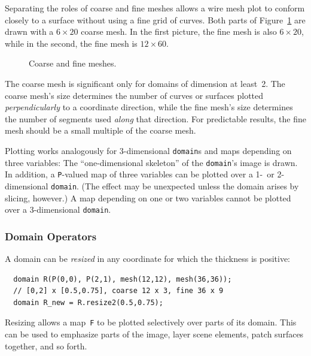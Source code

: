 \documentclass[12pt]{report}
\newcommand{\code}[1]{\texttt{#1}}
\begin{document}
Separating the roles of coarse and fine meshes allows a wire mesh plot
to conform closely to a surface without using a fine grid of curves.
Both parts of Figure~\ref{fig:plot} are drawn with a $6\times20$
coarse mesh. In the first picture, the fine mesh is also $6\times20$,
while in the second, the fine mesh is $12\times60$.

\begin{figure}[hbt]
  \begin{center}
    \hspace*{0.5in}
    
    \caption{Coarse and fine meshes.}
    \label{fig:plot}
  \end{center}
\end{figure}

The coarse mesh is significant only for domains of dimension at
least~2. The coarse mesh's size determines the number of curves or
surfaces plotted \emph{perpendicularly} to a coordinate direction,
while the fine mesh's size determines the number of segments used
\emph{along} that direction.  For predictable results, the fine mesh
should be a small multiple of the coarse mesh.

Plotting works analogously for 3-dimensional \code{domain}s and maps
depending on three variables: The ``one-dimensional skeleton'' of the
\code{domain}'s image is drawn.  In addition, a \code{P}-valued map of
three variables can be plotted over a 1-~or 2-dimensional
\code{domain}. (The effect may be unexpected unless the domain arises
by slicing, however.) A map depending on one or two variables cannot
be plotted over a 3-dimensional \code{domain}.


\subsubsection*{Domain Operators}

 A domain can be \emph{resized} in any
coordinate for which the thickness is positive:
\begin{verbatim}
  domain R(P(0,0), P(2,1), mesh(12,12), mesh(36,36));
  // [0,2] x [0.5,0.75], coarse 12 x 3, fine 36 x 9
  domain R_new = R.resize2(0.5,0.75);
\end{verbatim}
Resizing allows a map~\code{F} to be plotted selectively over parts of
its domain. This can be used to emphasize parts of the image, layer
scene elements, patch surfaces together, and so forth.
\end{document}
